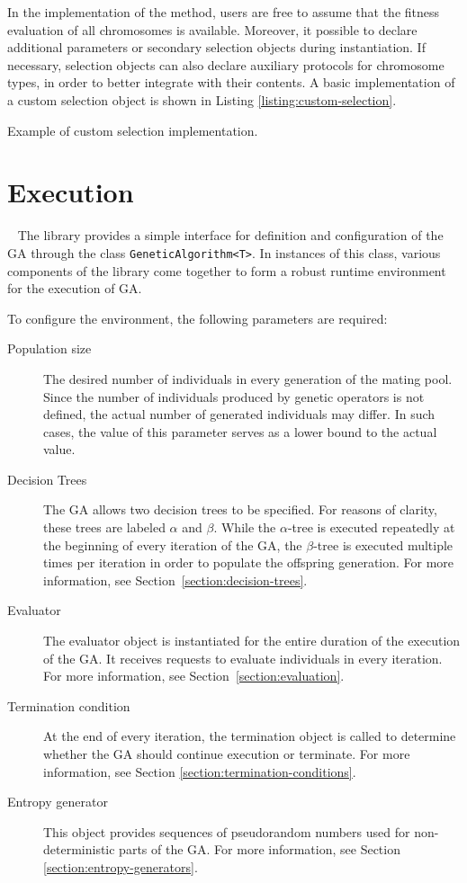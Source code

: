 In the implementation of the method, users are free to assume that the fitness evaluation of all chromosomes is available.  Moreover, it possible to declare additional parameters or secondary selection objects during instantiation. If necessary, selection objects can also declare auxiliary protocols for chromosome types, in order to better integrate with their contents. A basic implementation of a custom selection object is shown in Listing \ref{listing:custom-selection}.

\begin{listing}[ht]
	\caption{Example of custom selection implementation.}
	\label{listing:custom-selection}
\end{listing}

\section{Execution}~\label{section:execution}
The library provides a simple interface for definition and configuration of the GA through the class \texttt{GeneticAlgorithm<T>}. In instances of this class, various components of the library come together to form a robust runtime environment for the execution of GA.

To configure the environment, the following parameters are required:
~
\begin{description}
	\item[Population size]
	The desired number of individuals in every generation of the mating pool. Since the number of individuals produced by genetic operators is not defined, the actual number of generated individuals may differ. In such cases, the value of this parameter serves as a lower bound to the actual value.

	\item[Decision Trees]
	The GA allows two decision trees to be specified. For reasons of clarity, these trees are labeled $\alpha$ and $\beta$. While the $\alpha$-tree is executed repeatedly at the beginning of every iteration of the GA, the $\beta$-tree is executed multiple times per iteration in order to populate the offspring generation. For more information, see Section~\ref{section:decision-trees}.

	\item[Evaluator]
	The evaluator object is instantiated for the entire duration of the execution of the GA. It receives requests to evaluate individuals in every iteration. For more information, see Section~\ref{section:evaluation}.

	\item[Termination condition]
	At the end of every iteration, the termination object is called to determine whether the GA should continue execution or terminate. For more information, see Section \ref{section:termination-conditions}.

	\item[Entropy generator]
	This object provides sequences of pseudorandom numbers used for non-deterministic parts of the GA. For more information, see Section \ref{section:entropy-generators}.
\end{description}

